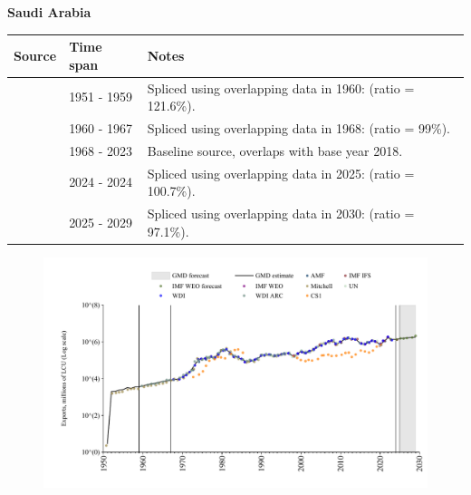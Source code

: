 \documentclass[12pt,a4paper,landscape]{article}
\begin{document}
\begin{adjustbox}{max totalsize={\paperwidth}{\paperheight},center}
\begin{minipage}[t][\textheight][t]{\textwidth}
\vspace*{0.5cm}
{}
\begin{center}
{\Large\bfseries Saudi Arabia}
\end{center}
\vspace{0.5cm}
\begin{table}[H]
\centering
\small
\begin{tabular}{|l|l|l|}
\hline
\textbf{Source} & \textbf{Time span} & \textbf{Notes} \\
\hline
\rowcolor{white}\cite{Mitchell}& 1951 - 1959 &Spliced using overlapping data in 1960: (ratio = 121.6\%).\\
\rowcolor{lightgray}\cite{WDI_ARC}& 1960 - 1967 &Spliced using overlapping data in 1968: (ratio = 99\%).\\
\rowcolor{white}\cite{WDI}& 1968 - 2023 &Baseline source, overlaps with base year 2018.\\
\rowcolor{lightgray}\cite{IMF_IFS}& 2024 - 2024 &Spliced using overlapping data in 2025: (ratio = 100.7\%).\\
\rowcolor{white}\cite{IMF_WEO_forecast}& 2025 - 2029 &Spliced using overlapping data in 2030: (ratio = 97.1\%).\\
\hline
\end{tabular}
\end{table}
\begin{figure}[H]
\centering
\includegraphics[width=\textwidth,height=0.6\textheight,keepaspectratio]{graphs/SAU_exports.pdf}
\end{figure}
\end{minipage}
\end{adjustbox}
\end{document}
